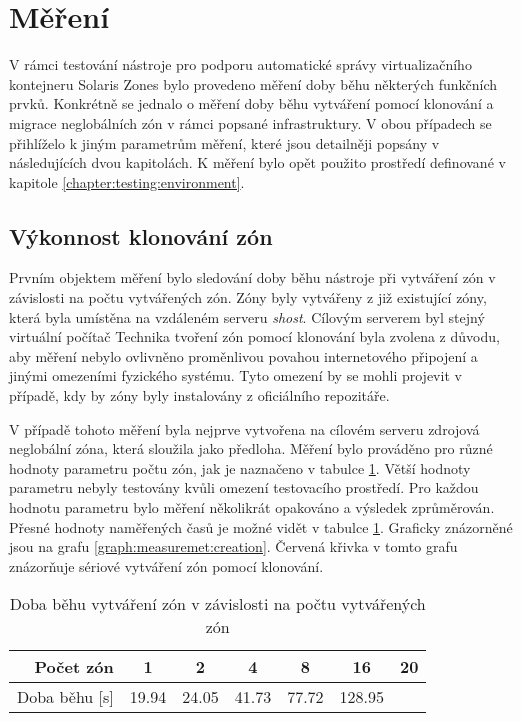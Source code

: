 \section{Měření}
\label{chapter:measurement}
V rámci testování nástroje pro podporu automatické správy virtualizačního kontejneru Solaris Zones bylo provedeno měření doby
běhu některých funkčních prvků. Konkrétně se jednalo o měření doby běhu vytváření pomocí klonování a migrace neglobálních zón
v rámci popsané infrastruktury. V obou případech se přihlíželo k jiným parametrům měření, které jsou detailněji popsány v 
následujících dvou kapitolách. K měření bylo opět použito prostředí definované v kapitole \ref{chapter:testing:environment}.
\subsection{Výkonnost klonování zón}
\label{chapter:measurement:creation}
Prvním objektem měření bylo sledování doby běhu nástroje při vytváření zón v závislosti na počtu vytvářených zón. Zóny byly
vytvářeny z již existující zóny, která byla umístěna na vzdáleném serveru \textit{shost}. Cílovým serverem byl stejný virtuální počítač
Technika tvoření zón pomocí klonování byla zvolena z důvodu, aby měření nebylo ovlivněno proměnlivou povahou internetového připojení
a jinými omezeními fyzického systému. Tyto omezení by se mohli projevit v případě, kdy by zóny byly instalovány z oficiálního repozitáře.

V případě tohoto měření byla nejprve vytvořena na cílovém serveru zdrojová neglobální zóna, která sloužila jako předloha.
Měření bylo prováděno pro různé hodnoty parametru počtu zón, jak je naznačeno v tabulce \ref{table:measuremet:creation}. Větší
hodnoty parametru nebyly testovány kvůli omezení testovacího prostředí. Pro každou hodnotu parametru bylo měření několikrát
opakováno a výsledek zprůměrován. Přesné hodnoty naměřených časů je možné vidět v tabulce \ref{table:measuremet:creation}. Graficky
znázorněné jsou na grafu \ref{graph:measuremet:creation}. Červená křivka v tomto grafu znázorňuje sériové vytváření zón pomocí klonování.

\begin{table}
  \centering
  \label{table:measuremet:creation}
  \caption{Doba běhu vytváření zón v závislosti na počtu vytvářených zón}
  \begin{tabular}{ r | c c c c c c}
   Počet zón & 1 & 2 & 4 & 8 & 16 & 20  \\ \hline
   Doba běhu [s] & 19.94 & 24.05 & 41.73 & 77.72 & 128.95 & \\
  \end{tabular}
\end{table}

